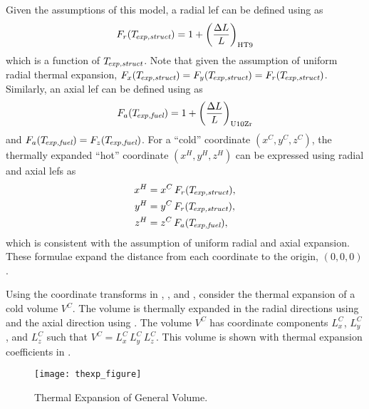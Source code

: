     Given the assumptions of this model, a radial \gls{lef} can be defined using 
     as
    \begin{equation}
      \label{eq:lef_r}
      F_r(T_{\!\mbox{\scriptsize \em exp,struct}}) = 1 + \left(\frac{\Delta L}{L}\right)_{\text{HT9}}
    \end{equation}
    which is a function of $T_{\!\mbox{\scriptsize \em exp,struct}}$. Note that given the assumption of 
    uniform radial thermal expansion, ${F_x(T_{\!\mbox{\scriptsize \em exp,struct}}) = F_y(T_{\!\mbox{\scriptsize \em exp,struct}}) =
    F_r(T_{\!\mbox{\scriptsize \em exp,struct}})}$.
    Similarly, an axial \gls{lef} can be defined using  as 
    \begin{equation}
      \label{eq:lef_a}
      F_a({T_{\!\mbox{\scriptsize \em exp,fuel}}}) = 1 + \left(\frac{\Delta L}{L}\right)_{\text{U10Zr}}
    \end{equation}
    and $F_a({T_{\!\mbox{\scriptsize \em exp,fuel}}}) = F_z({T_{\!\mbox{\scriptsize \em exp,fuel}}})$. For a ``cold'' coordinate 
    $(x^C,y^C,z^C)$, the thermally expanded ``hot'' coordinate $(x^H,y^H,z^H)$ 
    can be expressed using radial and axial \glspl{lef} as
    \begin{align}
      \label{eq:expand_x}
      x^H &= x^C \, F_r(T_{\!\mbox{\scriptsize \em exp,struct}}), \\
      \label{eq:expand_y}
      y^H &= y^C \, F_r(T_{\!\mbox{\scriptsize \em exp,struct}}), \\
      \label{eq:expand_z}
      z^H &= z^C \, F_a({T_{\!\mbox{\scriptsize \em exp,fuel}}}),
    \end{align}
    which is consistent with the assumption of uniform radial and axial 
    expansion. These formulae expand the distance from each coordinate to the
    origin, $(0,0,0)$.

    Using the coordinate transforms in , ,
    and , consider the thermal expansion of a cold volume
    $V^C$. The volume is thermally expanded in the radial directions using
     and the axial direction using . The volume
    $V^C$ has coordinate components $L_x^C$, $L_y^C$, and $L_z^C$ such that
    ${V^C = L_x^C \, L_y^C \, L_z^C}$. This volume is shown with thermal
    expansion coefficients in .

    \begin{figure}
      \centering
      \texttt{[image: thexp\_figure]}
      \caption{Thermal Expansion of General Volume.}
      \label{fig:thexp_figure}
    \end{figure}
    
